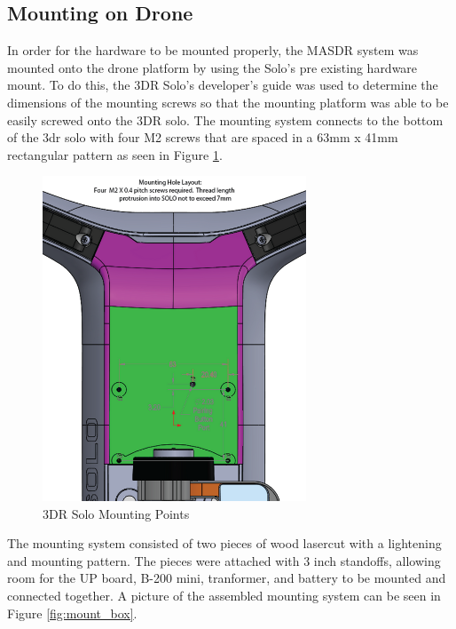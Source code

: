 \subsection{Mounting on Drone}
In order for the hardware to be mounted properly, the MASDR system was mounted onto the drone platform by using the Solo’s pre existing hardware mount. To do this, the 3DR Solo’s developer's guide was used to determine the dimensions of the mounting screws so that the mounting platform was able to be easily screwed onto the 3DR solo. The mounting system connects to the bottom of the 3dr solo with four M2 screws that are spaced in a 63mm x 41mm rectangular pattern as seen in Figure \ref{fig:Solo_mount}.
\begin{figure}[ht]
\centering
\includegraphics[width=0.70\textwidth]{img/solo_mount_points.png}
\caption{3DR Solo Mounting Points}
\label{fig:Solo_mount}
\end{figure} \par
The mounting system consisted of two pieces of wood lasercut with a lightening and mounting pattern. The pieces were attached with 3 inch standoffs, allowing room for the UP board, B-200 mini, tranformer, and battery to be mounted and connected together. A picture of the assembled mounting system can be seen in Figure \ref{fig:mount_box}.
